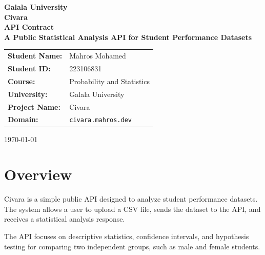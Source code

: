 \documentclass[12pt,a4paper]{article}
\begin{document}
\begin{titlepage}
    \centering

    \vspace*{1.5cm}

    {\Large \textbf{Galala University}}\\[1.5cm]

    {\LARGE \textbf{Civara}}\\[0.4cm]

    {\Large \textbf{API Contract}}\\[0.5cm]

    {\large \textbf{A Public Statistical Analysis API for Student Performance Datasets}}\\[2cm]

    \begin{table}[h!]
        \centering
        \renewcommand{\arraystretch}{1.4}
        \begin{tabular}{>{\bfseries}l l}
            Student Name: & Mahros Mohamed \\
            Student ID: & 223106831 \\
            Course: & Probability and Statistics \\
            University: & Galala University \\
            Project Name: & Civara \\
            Domain: & \texttt{civara.mahros.dev} \\
        \end{tabular}
    \end{table}

    \vfill

    {\large \today}

\end{titlepage}


\section{Overview}

Civara is a simple public API designed to analyze student performance datasets. The system allows a user to upload a CSV file, sends the dataset to the API, and receives a statistical analysis response.

The API focuses on descriptive statistics, confidence intervals, and hypothesis testing for comparing two independent groups, such as male and female students.
\end{document}
